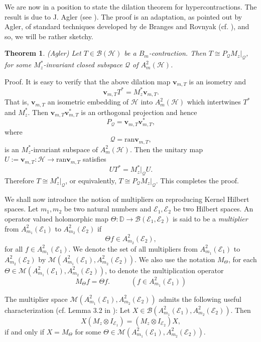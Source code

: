 \documentclass[12pt]{amsart}
\newtheorem{Theorem}{\sc Theorem}[section]
\begin{document}
We are now in a position to state the dilation theorem for
hypercontractions. The result is due to J. Agler (see \cite{Ag}).
The proof is an adaptation, as pointed out by Agler, of standard techniques
developed by de Branges and Rovnyak (cf. \cite{JS-S}), and so,
we will be rather sketchy.

\begin{Theorem}\label{Agler}\textsf{(Agler)}
Let $T \in {\mathcal{B}}({\mathcal{H}})$ be a $B_m$-contraction. Then $T \cong
P_{\mathcal{Q}} M_z|_{\mathcal{Q}}$, for some $M_z^*$-invariant closed subspace
${\mathcal{Q}}$ of $A^2_m({\mathcal{H}})$.
\end{Theorem}
{\noindent}\textsf{Proof.} It is easy to verify that the above dilation map
$\bm{v}_{m,T}$ is an isometry and \[\bm{v}_{m, T} T^* = M_z^*
\bm{v}_{m, T}.\]That is, ${\bm{v}}_{m, T}$ an isometric embedding of
${\mathcal{H}}$ into $A^2_m({\mathcal{H}})$ which intertwines $T^*$ and $M^*_z$. Then
$\bm{v}_{m, T} \bm{v}_{m, T}^*$ is an orthogonal projection and
hence \[P_{\mathcal{Q}} = \bm{v}_{m, T} \bm{v}_{m, T}^*,\]where \[{\mathcal{Q}} =
\mbox{ran} \bm{v}_{m, T},\]is an $M_z^*$-invariant subspace of
$A^2_m({\mathcal{H}})$. Then the unitary map $U := {\bm{v}}_{m,T} : {\mathcal{H}} {\rightarrow}
\mbox{ran} {\bm{v}}_{m,T}$ satisfies \[U T^* = M_z^*|_{\mathcal{Q}} U.\]
Therefore $T\cong M_z^*|_{\mathcal{Q}}$, or equivalently, $T \cong P_{\mathcal{Q}}
M_z|_{\mathcal{Q}}$. This completes the proof. {\hfill \vrule height6pt width 6pt depth 0pt}

We shall now introduce the notion of multipliers on reproducing
Kernel Hilbert spaces. Let $m_1, m_2$ be two natural numbers and
${\mathcal{E}}_1, {\mathcal{E}}_2$ be two Hilbert spaces. An operator valued
holomorphic map $\Theta : \mathbb{D} {\rightarrow} {\mathcal{B}}({\mathcal{E}}_1, {\mathcal{E}}_2)$ is
said to be a \textit{multiplier} from $A^2_{m_1}({\mathcal{E}}_1)$ to
$A^2_{m_2}({\mathcal{E}}_2)$ if
\[\Theta f \in A^2_{m_2}({\mathcal{E}}_2),\] for all $f \in
A^2_{m_1}({\mathcal{E}}_1)$. We denote the set of all multipliers from
$A^2_{m_1}({\mathcal{E}}_1)$ to $A^2_{m_2}({\mathcal{E}}_2)$ by
${\mathcal{M}}(A^2_{m_1}({\mathcal{E}}_1), A^2_{m_2}({\mathcal{E}}_2))$. We also use the
notation $M_{\Theta}$, for each $\Theta \in {\mathcal{M}}(A^2_{m_1}({\mathcal{E}}_1),
A^2_{m_2}({\mathcal{E}}_2))$, to denote the multiplication operator
\[M_{\Theta} f = \Theta f. \quad \quad \quad (f \in
A^2_{m_1}({\mathcal{E}}_1))\]

{\noindent} The multiplier space ${\mathcal{M}}(A^2_{m_1}({\mathcal{E}}_1),
A^2_{m_2}({\mathcal{E}}_2))$ admits the following useful characterization
(cf. Lemma 3.2 in \cite{S-JOT}): Let $X \in {\mathcal{B}}(A^2_{m_1}({\mathcal{E}}_1),
A^2_{m_2}({\mathcal{E}}_2))$. Then
\[X(M_z \otimes I_{{\mathcal{E}}_1}) = (M_z \otimes I_{{\mathcal{E}}_2}) X,\]if and
only if $X = M_{\Theta}$ for some $\Theta \in {\mathcal{M}}(A^2_{m_1}({\mathcal{E}}_1), A^2_{m_2}({\mathcal{E}}_2))$.
\end{document}
